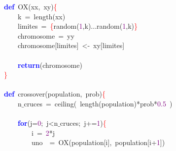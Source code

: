 \noindent
\mbox{}\textbf{\textcolor{Blue}{def}}\ OX\textcolor{BrickRed}{(}xx\textcolor{BrickRed}{,}\ xy\textcolor{BrickRed}{)}\textcolor{Red}{\{} \\
\mbox{}\ \ \ \ k\ \textcolor{BrickRed}{=}\ length\textcolor{BrickRed}{(}xx\textcolor{BrickRed}{)} \\
\mbox{}\ \ \ \ limites\ \textcolor{BrickRed}{=}\ \textcolor{Red}{\{}random\textcolor{BrickRed}{(}\textcolor{Purple}{1}\textcolor{BrickRed}{,}k\textcolor{BrickRed}{)...}random\textcolor{BrickRed}{(}\textcolor{Purple}{1}\textcolor{BrickRed}{,}k\textcolor{BrickRed}{)}\textcolor{Red}{\}} \\
\mbox{}\ \ \ \ chromosome\ \textcolor{BrickRed}{=}\ yy \\
\mbox{}\ \ \ \ chromosome\textcolor{BrickRed}{[}limites\textcolor{BrickRed}{]}\ \textcolor{BrickRed}{\textless{}-}\ xy\textcolor{BrickRed}{[}limites\textcolor{BrickRed}{]} \\
\mbox{} \\
\mbox{}\ \ \ \ \textbf{\textcolor{Blue}{return}}\textcolor{BrickRed}{(}chromosome\textcolor{BrickRed}{)} \\
\mbox{}\textcolor{Red}{\}} \\
\mbox{} \\
\mbox{}\textbf{\textcolor{Blue}{def}}\ crossover\textcolor{BrickRed}{(}population\textcolor{BrickRed}{,}\ prob\textcolor{BrickRed}{)}\textcolor{Red}{\{} \\
\mbox{}\ \ \ \ n$\_$cruces\ \textcolor{BrickRed}{=}\ ceiling\textcolor{BrickRed}{(}\ length\textcolor{BrickRed}{(}population\textcolor{BrickRed}{)*}prob\textcolor{BrickRed}{*}\textcolor{Purple}{0.5}\ \textcolor{BrickRed}{)} \\
\mbox{} \\
\mbox{}\ \ \ \ \textbf{\textcolor{Blue}{for}}\textcolor{BrickRed}{(}j\textcolor{BrickRed}{=}\textcolor{Purple}{0}\textcolor{BrickRed}{;}\ j\textcolor{BrickRed}{\textless{}}n$\_$cruces\textcolor{BrickRed}{;}\ j\textcolor{BrickRed}{+=}\textcolor{Purple}{1}\textcolor{BrickRed}{)}\textcolor{Red}{\{} \\
\mbox{}\ \ \ \ \ \ \ \ i\ \textcolor{BrickRed}{=}\ \textcolor{Purple}{2}\textcolor{BrickRed}{*}j \\
\mbox{}\ \ \ \ \ \ \ \ uno\ \ \textcolor{BrickRed}{=}\ OX\textcolor{BrickRed}{(}population\textcolor{BrickRed}{[}i\textcolor{BrickRed}{],}\ population\textcolor{BrickRed}{[}i\textcolor{BrickRed}{+}\textcolor{Purple}{1}\textcolor{BrickRed}{])} \\
